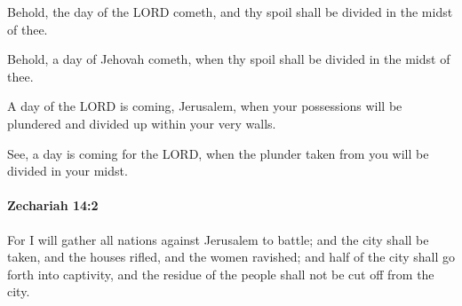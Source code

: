 			Behold, the day of the LORD cometh, and thy spoil shall be divided in the midst of thee.

			\begin{versebox}
					\item[BHS] 
					\item[LXX] 
					\item[ASV] Behold, a day of Jehovah cometh, when thy spoil shall be divided in the midst of thee.
					\item[NIV] A day of the LORD is coming, Jerusalem, when your possessions will be plundered and divided up within your very walls.
					\item[NRSV] See, a day is coming for the LORD, when the plunder taken from you will be divided in your midst.
			\end{versebox}

		\paragraph{Zechariah 14:2} %
			\label{ZECHARIAH-14-2}

			For I will gather all nations against Jerusalem to battle; and the city shall be taken, and the houses rifled, and the women ravished; and half of the city shall go forth into captivity, and the residue of the people shall not be cut off from the city.

